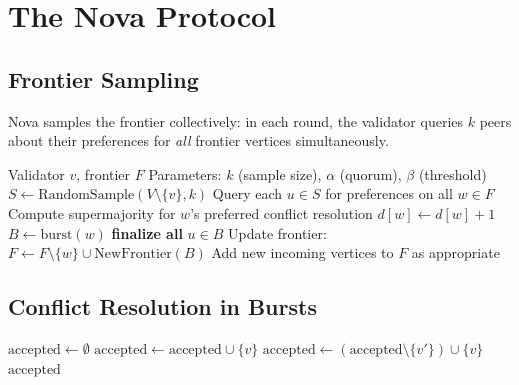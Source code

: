 \section{The Nova Protocol}

\label{sec:nova-protocol}

\subsection{Frontier Sampling}

Nova samples the frontier collectively: in each round, the validator queries $k$ peers
about their preferences for \emph{all} frontier vertices simultaneously.

\begin{algorithm}[H]
\caption{Nova Protocol --- Frontier-Based Burst Finalization}
\label{alg:nova-nova-core}
\begin{algorithmic}[1]
\Require Validator $v$, frontier $F$
\Require Parameters: $k$ (sample size), $\alpha$ (quorum), $\beta$ (threshold)
    \State $S \gets \text{RandomSample}(V \setminus \{v\}, k)$
    \State Query each $u \in S$ for preferences on all $w \in F$
        \State Compute supermajority for $w$'s preferred conflict resolution
            \State $d[w] \gets d[w] + 1$
        \EndIf
            \State $B \gets \text{burst}(w)$ 
            \State \textbf{finalize all} $u \in B$ 
            \State Update frontier: $F \gets F \setminus \{w\} \cup \text{NewFrontier}(B)$
        \EndIf
    \EndFor
    \State Add new incoming vertices to $F$ as appropriate
\EndWhile
\end{algorithmic}
\end{algorithm}

\subsection{Conflict Resolution in Bursts}

\begin{algorithm}[H]
\caption{Nova Conflict Resolution During Burst}
\label{alg:nova-nova-conflict}
\begin{algorithmic}[1]
    \State $\text{accepted} \gets \emptyset$
     
            \State $\text{accepted} \gets \text{accepted} \cup \{v\}$
        \Else
            \State {}
                    \State $\text{accepted} \gets (\text{accepted} \setminus \{v'\}) \cup \{v\}$
                \EndIf
            \EndFor
        \EndIf
    \EndFor
    \Return $\text{accepted}$
\EndFunction
\end{algorithmic}
\end{algorithm}

